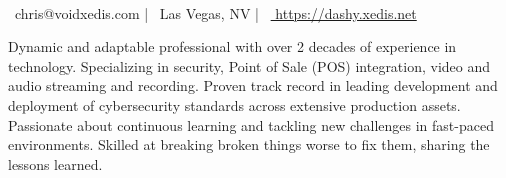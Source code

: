 \documentclass[]{resume-format}
\begin{document}
\begin{center}
      \\
    \vspace{2mm}
    {\faEnvelope\ chris@voidxedis.com} | {\faMapMarker\ Las Vegas, NV} | {\faLink\ \href{ https://dashy.xedis.net }{ https://dashy.xedis.net }}
\end{center}


\begin{cvpersonalstatement}
  \item { Dynamic and adaptable professional with over 2 decades of experience in technology.  Specializing in security, Point of Sale (POS) integration, video and audio streaming and recording. Proven track record in leading development and deployment of cybersecurity standards across extensive production assets. Passionate about continuous learning and tackling new challenges in fast-paced environments. Skilled at breaking broken things worse to fix them, sharing the lessons learned. }
\end{cvpersonalstatement}


\end{document}
